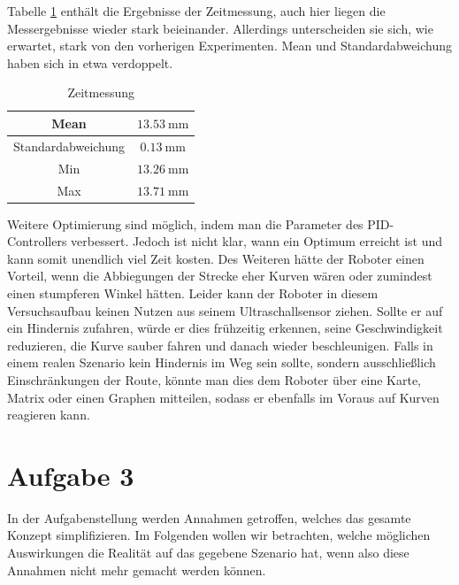 \documentclass[ngerman]{tudscrreprt}
\begin{document}
Tabelle \ref{table:zeitmessung3} enthält die Ergebnisse der Zeitmessung, auch hier liegen die Messergebnisse wieder stark beieinander. Allerdings unterscheiden sie sich, wie erwartet, stark von den vorherigen Experimenten. Mean und Standardabweichung haben sich in etwa verdoppelt.
%
\begin{table}[H]
    \centering
    \begin{tabular}{|c|c|}
    \hline
    Mean               & $\SI{13,53}{\mm}$ \\ \hline
    Standardabweichung & $\SI{0,13}{\mm}$ \\ \hline
    Min                & $\SI{13,26}{\mm}$ \\ \hline
    Max                & $\SI{13,71}{\mm}$ \\ \hline
    \end{tabular}
    \caption{Zeitmessung}
    \label{table:zeitmessung3}
\end{table}
%
Weitere Optimierung sind möglich, indem man die Parameter des PID-Controllers verbessert. Jedoch ist nicht klar, wann ein Optimum erreicht ist und kann somit unendlich viel Zeit kosten. Des Weiteren hätte der Roboter einen Vorteil, wenn die Abbiegungen der Strecke eher Kurven wären oder zumindest einen stumpferen Winkel hätten. Leider kann der Roboter in diesem Versuchsaufbau keinen Nutzen aus seinem Ultraschallsensor ziehen. Sollte er auf ein Hindernis zufahren, würde er dies frühzeitig erkennen, seine Geschwindigkeit reduzieren, die Kurve sauber fahren und danach wieder beschleunigen. Falls in einem realen Szenario kein Hindernis im Weg sein sollte, sondern ausschließlich Einschränkungen der Route, könnte man dies dem Roboter über eine Karte, Matrix oder einen Graphen mitteilen, sodass er ebenfalls im Voraus auf Kurven reagieren kann.

\chapter{Aufgabe 3}
In der Aufgabenstellung werden Annahmen getroffen, welches das gesamte Konzept simplifizieren. Im Folgenden wollen wir betrachten, welche möglichen Auswirkungen die Realität auf das gegebene Szenario hat, wenn also diese Annahmen nicht mehr gemacht werden können.
\end{document}
